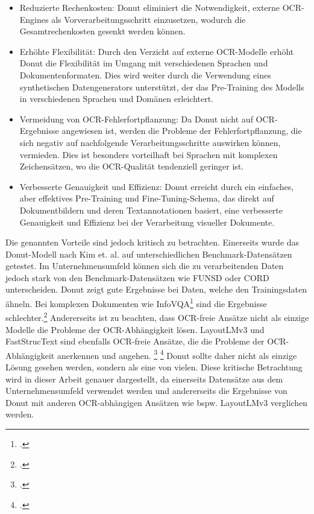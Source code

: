 \begin{itemize}
    \item Reduzierte Rechenkosten: Donut eliminiert die Notwendigkeit, externe OCR-Engines als Vorverarbeitungsschritt einzusetzen, wodurch die Gesamtrechenkosten gesenkt werden können.
    \item Erhöhte Flexibilität: Durch den Verzicht auf externe OCR-Modelle erhöht Donut die Flexibilität im Umgang mit verschiedenen Sprachen und Dokumentenformaten. Dies wird weiter durch die Verwendung eines synthetischen Datengenerators unterstützt, der das Pre-Training des Modells in verschiedenen Sprachen und Domänen erleichtert.
    \item Vermeidung von OCR-Fehlerfortpflanzung: Da Donut nicht auf OCR-Ergebnisse angewiesen ist, werden die Probleme der Fehlerfortpflanzung, die sich negativ auf nachfolgende Verarbeitungsschritte auswirken können, vermieden. Dies ist besonders vorteilhaft bei Sprachen mit komplexen Zeichensätzen, wo die OCR-Qualität tendenziell geringer ist.
    \item Verbesserte Genauigkeit und Effizienz: Donut erreicht durch ein einfaches, aber effektives Pre-Training und Fine-Tuning-Schema, das direkt auf Dokumentbildern und deren Textannotationen basiert, eine verbesserte Genauigkeit und Effizienz bei der Verarbeitung visueller Dokumente.
\end{itemize}
Die genannten Vorteile sind jedoch kritisch zu betrachten. Einerseits wurde das Donut-Modell nach Kim et. al. auf unterschiedlichen Benchmark-Datensätzen getestet. Im Unternehmensumfeld können sich die zu verarbeitenden Daten jedoch stark von den Benchmark-Datensätzen wie \ac{FUNSD} oder \ac{CORD} unterscheiden. Donut zeigt gute Ergebnisse bei Daten, welche den Trainingsdaten ähneln. Bei komplexen Dokumenten wie InfoVQA\footcites[Vgl. dazu ausführlich][]{mathew_infographicvqa_2021} sind die Ergebnisse schlechter.\footcites[Vgl.][S. 693]{aggarwal_dublin_2023} Andererseits ist zu beachten, dass OCR-freie Ansätze nicht als einzige Modelle die Probleme der OCR-Abhängigkeit lösen. LayoutLMv3 und FastStrucText sind ebenfalls OCR-freie Ansätze, die die Probleme der OCR-Abhängigkeit anerkennen und angehen. \footcites[Vgl. dazu ausführlich][]{huang_layoutlmv3_2022} \footcites[Vgl. dazu ausführlich][]{zhai_fast-structext_2023} Donut sollte daher nicht als einzige Lösung gesehen werden, sondern als eine von vielen. Diese kritische Betrachtung wird in dieser Arbeit genauer dargestellt, da einerseits Datensätze aus dem Unternehmensumfeld verwendet werden und andererseits die Ergebnisse von Donut mit anderen OCR-abhängigen Ansätzen wie bspw. LayoutLMv3 verglichen werden.

